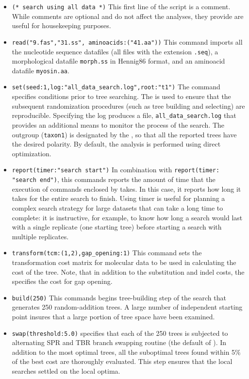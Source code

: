 \begin{itemize}
\item \texttt{(* search using all data *)} This first line of the script is a comment. While comments are optional and do not affect the analyses, they provide are useful for housekeeping purposes.
\item \texttt{read("9.fas","31.ss", aminoacids:("41.aa"))}
This command imports all the nucleotide sequence datafiles (all files with the extension \texttt{.seq}), a morphological datafile \texttt{morph.ss} in Hennig86 format, and an aminoacid datafile \texttt{myosin.aa}.
\item \texttt{set(seed:1,log:"all\_data\_search.log",root:"t1")} The  command specifies conditions prior to tree searching. The  is used to ensure that the subsequent randomization procedures (such as tree building and selecting) are reproducible. Specifying the log produces a file, \texttt{all\_data\_search.log} that provides an additional means to monitor the process of the search. The outgroup (\texttt{taxon1}) is designated by the , so that all the reported trees have the desired polarity. By default, the analysis is performed using direct optimization.
\item \texttt{report(timer:"search start")} In combination with \texttt{report(timer:\\"search end")}, this commands reports the amount of time that the execution of commands enclosed by  takes. In this case, it reports how long it takes for the entire search to finish. Using timer is useful for planning a complex search strategy for large datasets that can take a long time to complete: it is instructive, for example, to know how long a search would last with a single replicate (one starting tree) before starting a search with multiple replicates.
\item \texttt{transform(tcm:(1,2),gap\_opening:1)} This command sets the \\transformation cost matrix for molecular data to be used in calculating the cost of the tree. Note, that in addition to the substitution and indel costs, the  specifies the cost for gap opening.
\item \texttt{build(250)} This commands begins tree-building step of the search that generates 250 random-addition trees. A large number of independent starting point insures that a large portion of tree space have been examined.
\item \texttt{swap(threshold:5.0)}  specifies that each of the 250 trees is subjected to alternating SPR and TBR branch swapping routine (the default of \poy). In addition to the most optimal trees, all the suboptimal trees found within 5\% of the best cost are thoroughly evaluated. This step ensures that the local searches settled on the local optima.

\end{itemize}
